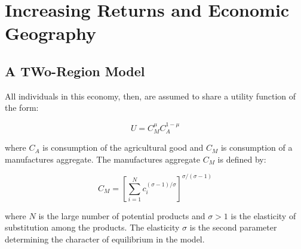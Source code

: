\chapter{Increasing Returns and Economic Geography}

\section{A TWo-Region Model}

All individuals in this economy, then, are assumed to share a utility function of the form:

\begin{equation}
    U = C_M^{\mu} C_A^{1 - \mu}
\end{equation}

where $C_A$ is consumption of the agricultural good and $C_M$ is consumption of a manufactures aggregate. The manufactures aggregate $C_M$ is defined by:

\begin{equation}
    C_M = \left[ \sum_{i=1}^N c_i^{(\sigma - 1)/\sigma}\right]^{\sigma/(\sigma - 1)}
\end{equation}

where $N$ is the large number of potential products and $\sigma > 1$ is the elasticity of substitution among the products. The elasticity $\sigma$ is the second parameter determining the character of equilibrium in the model.